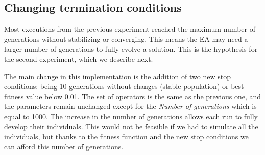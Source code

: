 \documentclass[runningheads,a4paper]{llncs}
\begin{document}
\subsection{Changing termination conditions}\label{E2}
Most executions from the previous experiment reached the maximum number of 
generations without stabilizing or converging. This means the EA may need a 
larger number of generations to fully evolve a solution. This is the hypothesis 
for the second experiment, which we describe next.

The main change in this implementation is the addition of two new stop conditions: being 10 generations without changes (stable population) or best fitness value below 0.01. 
The set of operators is the same as the previous one, and the parameters remain 
unchanged except for the \textit{Number of generations} which is equal to 1000. 
The increase in the number of generations allows each run to fully develop 
their individuals. This would not be feasible if we had to simulate all the 
individuals, but thanks to the fitness function and the new stop conditions we 
can afford this number of generations.
\end{document}
